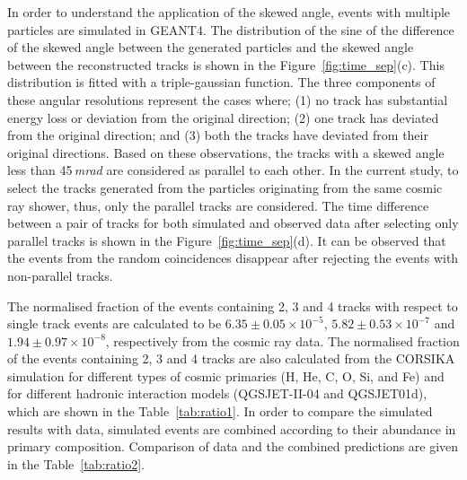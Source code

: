 \documentclass[a4paper,12pt,twoside,openany]{article}
\begin{document}
In order to understand the application of the skewed angle, events
with multiple particles are simulated in GEANT4. The distribution of
the sine of the difference of the skewed angle between the generated
particles and the skewed angle between the reconstructed tracks is
shown in the Figure~\ref{fig:time_sep}(c). This distribution is fitted
with a triple-gaussian function. The three components of these angular
resolutions represent the cases where; (1) no track has substantial
energy loss or deviation from the original direction; (2) one track
has deviated from the original direction; and (3) both the tracks have
deviated from their original directions. Based on these observations,
the tracks with a skewed angle less than 45\,\textit{mrad} are
considered as parallel to each other. In the current study, to select
the tracks generated from the particles originating from the same
cosmic ray shower, thus, only the parallel tracks are considered. The
time difference between a pair of tracks for both simulated and
observed data after selecting only parallel tracks is shown in the
Figure~\ref{fig:time_sep}(d). It can be observed that the events from
the random coincidences disappear after rejecting the events with
non-parallel tracks.

The normalised fraction of the events containing 2, 3 and 4 tracks
with respect to single track events are calculated to be
$6.35\pm 0.05\times 10^{-5}$, $5.82\pm 0.53\times 10^{-7}$ and
$1.94\pm 0.97\times 10^{-8}$, respectively from the cosmic ray data.
The normalised fraction of the events containing 2, 3 and 4 tracks are
also calculated from the CORSIKA simulation for different types of
cosmic primaries (H, He, C, O, Si, and Fe) and for different hadronic
interaction models (QGSJET-II-04 and QGSJET01d), which are shown in the
Table~\ref{tab:ratio1}. In order to compare the simulated results with
data, simulated events are combined according to their abundance in
primary composition\cite{cosmic1}. Comparison of data and
the combined predictions are given in the Table~\ref{tab:ratio2}.
\end{document}
